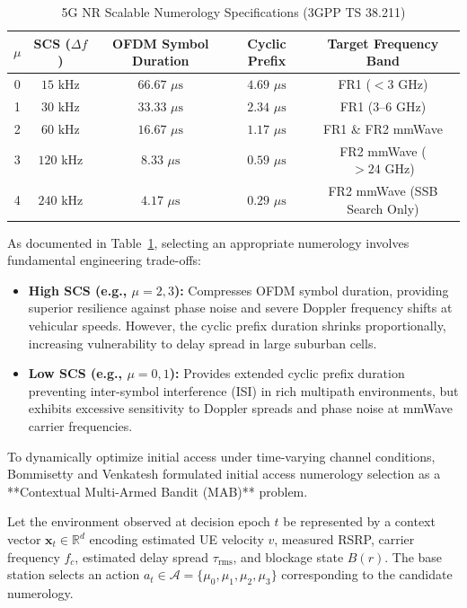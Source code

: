 \begin{table}[htbp]
\centering
\caption{5G NR Scalable Numerology Specifications (3GPP TS 38.211)}
\label{tab:5g_numerology}
\begin{tabular}{ccccc}
\toprule
$\mu$ & \textbf{SCS ($\Delta f$)} & \textbf{OFDM Symbol Duration} & \textbf{Cyclic Prefix} & \textbf{Target Frequency Band} \\
\midrule
0 & $15\text{~kHz}$ & $66.67\text{~}\mu\text{s}$ & $4.69\text{~}\mu\text{s}$ & FR1 ($< 3\text{~GHz}$) \\
1 & $30\text{~kHz}$ & $33.33\text{~}\mu\text{s}$ & $2.34\text{~}\mu\text{s}$ & FR1 ($3\text{--}6\text{~GHz}$) \\
2 & $60\text{~kHz}$ & $16.67\text{~}\mu\text{s}$ & $1.17\text{~}\mu\text{s}$ & FR1 \& FR2 mmWave \\
3 & $120\text{~kHz}$ & $8.33\text{~}\mu\text{s}$ & $0.59\text{~}\mu\text{s}$ & FR2 mmWave ($> 24\text{~GHz}$) \\
4 & $240\text{~kHz}$ & $4.17\text{~}\mu\text{s}$ & $0.29\text{~}\mu\text{s}$ & FR2 mmWave (SSB Search Only) \\
\bottomrule
\end{tabular}
\end{table}

As documented in Table~\ref{tab:5g_numerology}, selecting an appropriate numerology involves fundamental engineering trade-offs:
\begin{itemize}
    \item \textbf{High SCS (e.g., $\mu = 2, 3$):} Compresses OFDM symbol duration, providing superior resilience against phase noise and severe Doppler frequency shifts at vehicular speeds. However, the cyclic prefix duration shrinks proportionally, increasing vulnerability to delay spread in large suburban cells.
    \item \textbf{Low SCS (e.g., $\mu = 0, 1$):} Provides extended cyclic prefix duration preventing inter-symbol interference (ISI) in rich multipath environments, but exhibits excessive sensitivity to Doppler spreads and phase noise at mmWave carrier frequencies.
\end{itemize}

To dynamically optimize initial access under time-varying channel conditions, Bommisetty and Venkatesh \cite{bommisetty2024contextual} formulated initial access numerology selection as a **Contextual Multi-Armed Bandit (MAB)** problem.

Let the environment observed at decision epoch $t$ be represented by a context vector $\mathbf{x}_t \in \mathbb{R}^d$ encoding estimated UE velocity $v$, measured RSRP, carrier frequency $f_c$, estimated delay spread $\tau_{\mathrm{rms}}$, and blockage state $B(r)$. The base station selects an action $a_t \in \mathcal{A} = \{\mu_0, \mu_1, \mu_2, \mu_3\}$ corresponding to the candidate numerology.

